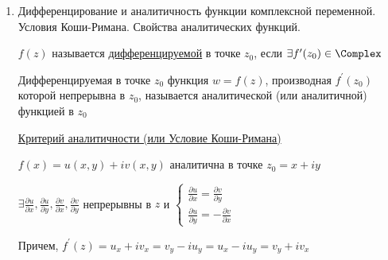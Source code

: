 \documentclass[12pt]{article}
\begin{document}
\begin{enumerate}
    $\ln z = \Ln z$ при $k = 0$ - т. н. главное значение
    
     Тригонометрические и гиперболические

    \begin{multicols}{2}
        \begin{center}
            $\sin z = \frac{e^{iz} - e^{-iz}}{2i}$

            $\cos z = \frac{e^{iz} + e^{-iz}}{2}$

            $\sh z = \frac{e^{z} - e^{-z}}{2}$

            $\ch z = \frac{e^{z} + e^{-z}}{2}$
        \end{center}
    \end{multicols}

    В $\Complex$ область значений этих функций является $\Complex$ - эти функции не ограничены


    \item Дифференцирование и аналитичность функции комплексной переменной. Условия Коши-Римана. Свойства аналитических функций.

    \Def $f(z)$ называется \hyperlink{derivative}{дифференцируемой} в точке $z_0$, если $\exists f^\prime(z_0) \in \Complex$

    \Defs Дифференцируемая в точке $z_0$ функция $w = f(z)$, производная $f^\prime(z_0)$ которой непрерывна в $z_0$, называется аналитической (или аналитичной) функцией в $z_0$

    \begin{MyTheorem}
        \Ths \hyperlink{cauchy_riemann}{Критерий аналитичности (или Условие Коши-Римана)}
    
        \begin{center}
            $f(x) = u(x, y) + i v(x, y)$ аналитична в точке $z_0 = x + iy$ 
            
        
            $\exists \frac{\partial u}{\partial x}, \frac{\partial u}{\partial y}, \frac{\partial v}{\partial x}, \frac{\partial v}{\partial y}$ непрерывны в $z$ и
            $\begin{cases}\frac{\partial u}{\partial x} = \frac{\partial v}{\partial y} \\ \frac{\partial u}{\partial y} = -\frac{\partial v}{\partial x}\end{cases}$
        \end{center}
    
        Причем, $f^\prime(z) = u_x + i v_x = v_y - i u_y = u_x - i u_y = v_y + i v_x$
    \end{MyTheorem}
    

\end{enumerate}
\end{document}
